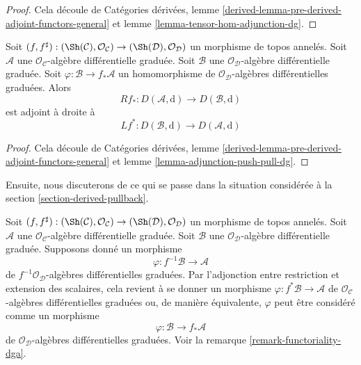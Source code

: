 \begin{proof}
Cela découle de Catégories dérivées, lemme
\ref{derived-lemma-pre-derived-adjoint-functors-general}
et lemme \ref{lemma-tensor-hom-adjunction-dg}.
\end{proof}

\begin{lemma}
\label{lemma-derived-adjoint-push-pull}
Soit $(f, f^\sharp) : (\Sh(\mathcal{C}), \mathcal{O}_\mathcal{C})
\to (\Sh(\mathcal{D}), \mathcal{O}_\mathcal{D})$ un
morphisme de topos annelés. Soit $\mathcal{A}$ une
$\mathcal{O}_\mathcal{C}$-algèbre différentielle graduée. Soit $\mathcal{B}$ une
$\mathcal{O}_\mathcal{D}$-algèbre différentielle graduée. Soit
$\varphi : \mathcal{B} \to f_*\mathcal{A}$ un homomorphisme de
$\mathcal{O}_\mathcal{D}$-algèbres différentielles graduées.
Alors
$$ Rf_*
:
D(\mathcal{A}, \text{d})
\longrightarrow
D(\mathcal{B}, \text{d})
$$ est
adjoint à droite à
$$
Lf^* :
D(\mathcal{B}, \text{d})
\longrightarrow
D(\mathcal{A}, \text{d})
$$
\end{lemma}

\begin{proof}
Cela découle de Catégories dérivées, lemme
\ref{derived-lemma-pre-derived-adjoint-functors-general}
et lemme \ref{lemma-adjunction-push-pull-dg}.
\end{proof}

\noindent
Ensuite, nous discuterons de ce qui se passe dans la situation considérée
à la section \ref{section-derived-pullback}.

\medskip\noindent
Soit $(f, f^\sharp) : (\Sh(\mathcal{C}), \mathcal{O}_\mathcal{C})
\to (\Sh(\mathcal{D}), \mathcal{O}_\mathcal{D})$ un morphisme
de topos annelés. Soit $\mathcal{A}$ une
$\mathcal{O}_\mathcal{C}$-algèbre différentielle graduée. Soit $\mathcal{B}$ une
$\mathcal{O}_\mathcal{D}$-algèbre différentielle graduée. Supposons donné un
morphisme
$$
\varphi : f^{-1}\mathcal{B} \to \mathcal{A}
$$ de
$f^{-1}\mathcal{O}_\mathcal{D}$-algèbres différentielles graduées. Par l'adjonction
entre restriction et extension des scalaires, cela revient à se donner
un morphisme $\varphi : f^*\mathcal{B} \to \mathcal{A}$ de
$\mathcal{O}_\mathcal{C}$-algèbres différentielles graduées ou, de manière équivalente,
$\varphi$ peut être considéré comme un morphisme
$$
\varphi : \mathcal{B} \to f_*\mathcal{A}
$$
de $\mathcal{O}_\mathcal{D}$-algèbres différentielles graduées.
Voir la remarque \ref{remark-functoriality-dga}.

